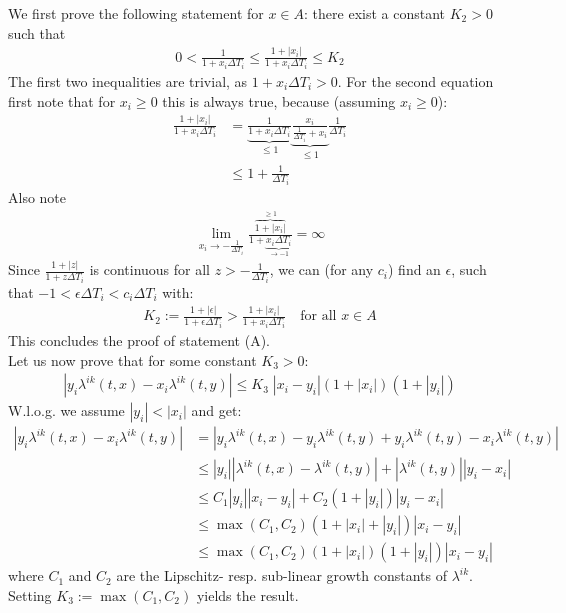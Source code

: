 \documentclass[12pt]{article}
\begin{document}
We first prove the following statement for $ x \in A$: there exist a constant $K_2 > 0$ such that
\begin{align*}
	0 < \frac{1}{1+ x_i\Delta T_i } \le \frac{1+|x_i|}{1+ x_i\Delta T_i } \le K_2 \tag{A}
\end{align*}
The first two inequalities are trivial, as $1 + x_i\Delta T_i > 0$.
For the second equation first note that for $x_i \ge 0$ this is always true, because (assuming $x_i \ge 0$):
\begin{align*}
	\frac{1+|x_i|}{1+ x_i\Delta T_i } &= \underbrace{\frac{1}{1+ x_i\Delta T_i }}_{\le 1}  \underbrace{\frac{x_i}{\frac{1}{\Delta T_i}+ x_i }}_{\le 1}\frac{1}{\Delta T_i}\\
	&\le 1 + \frac{1}{\Delta T_i}
\end{align*}
Also note 
\begin{align*}
	\lim\limits_{x_i \rightarrow -\frac{1}{\Delta T_i}} \frac{\overbrace{1 + |x_i|}^{ \ge 1}}{1+ \underbrace{x_i\Delta T_i}_{\rightarrow -1}} = \infty
\end{align*}
Since $\frac{1+|z|}{1+ z\Delta T_i }$ is continuous for all $z > -\frac{1}{\Delta T_i}$, we can (for any $c_i$) find an $\epsilon$, such that $-1 < \epsilon\Delta T_i < c_i \Delta T_i$ with:
\begin{align*}
	K_2:= \frac{1+|\epsilon|}{1+ \epsilon\Delta T_i } > \frac{1+|x_i|}{1+ x_i\Delta T_i } \quad \text{for all } x \in A
\end{align*}
This concludes the proof of statement (A).\\
Let us now prove that for some constant $K_3 > 0$:
\begin{align*}
	\left| y_i \lambda^{ik}(t, x) - x_i \lambda^{ik}(t,y) \right|\le K_3 \;\left| x_i - y_i \right| \left(1 + \left|x_i\right|\right)\left(1 + \left|y_i\right|\right) \tag{B}
\end{align*}
W.l.o.g. we assume $|y_i| < |x_i|$ and get:
\begin{align*}
	\left| y_i \lambda^{ik}(t, x) - x_i \lambda^{ik}(t,y) \right| &= \left| y_i \lambda^{ik}(t, x) - y_i \lambda^{ik}(t,y) + y_i \lambda^{ik}(t,y) - x_i \lambda^{ik}(t,y) \right|\\
	&\le \left| y_i \right| \left|\lambda^{ik}(t, x) - \lambda^{ik}(t,y) \right|+ \left|\lambda^{ik}(t,y)\right| \left|y_i - x_i\right|\\
	& \le C_1 \left| y_i \right| \left|x_i - y_i\right|+ C_2\left(1 + \left|y_i\right|\right) \left|y_i - x_i\right|\\
	&\le \max\left(C_1, C_2\right) \left(1 + \left|x_i\right| + \left| y_i \right| \right) \left|x_i - y_i\right|\\
	&\le \max\left(C_1, C_2\right) \left(1 + \left|x_i\right|\right) \left( 1 +\left| y_i \right| \right) \left|x_i - y_i\right|
\end{align*}
where $C_1$ and $C_2$ are the Lipschitz- resp. sub-linear growth constants of $\lambda^{i k}$. Setting $K_3:=\max\left(C_1, C_2\right)$ yields  the result.
\end{document}
